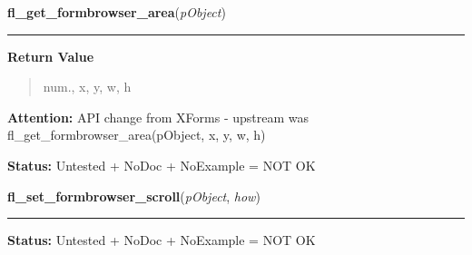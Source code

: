 \hspace{.8\funcindent}\begin{boxedminipage}{\funcwidth}

    \raggedright \textbf{fl\_get\_formbrowser\_area}(\textit{pObject})

    \vspace{-1.5ex}

    \rule{\textwidth}{0.5\fboxrule}
\setlength{\parskip}{2ex}
\setlength{\parskip}{1ex}
      \textbf{Return Value}
    \vspace{-1ex}

      \begin{quote}
      num., x, y, w, h

      \end{quote}

\textbf{Attention:} API change from XForms - upstream was fl\_get\_formbrowser\_area(pObject, 
x, y, w, h)



\textbf{Status:} Untested + NoDoc + NoExample = NOT OK



    \end{boxedminipage}

    \label{xformslib:library:fl_set_formbrowser_scroll}

    \vspace{0.5ex}

\hspace{.8\funcindent}\begin{boxedminipage}{\funcwidth}

    \raggedright \textbf{fl\_set\_formbrowser\_scroll}(\textit{pObject}, \textit{how})

    \vspace{-1.5ex}

    \rule{\textwidth}{0.5\fboxrule}
\setlength{\parskip}{2ex}
\setlength{\parskip}{1ex}
\textbf{Status:} Untested + NoDoc + NoExample = NOT OK



    \end{boxedminipage}

    \label{xformslib:library:fl_set_formbrowser_hscrollbar}

    \vspace{0.5ex}

